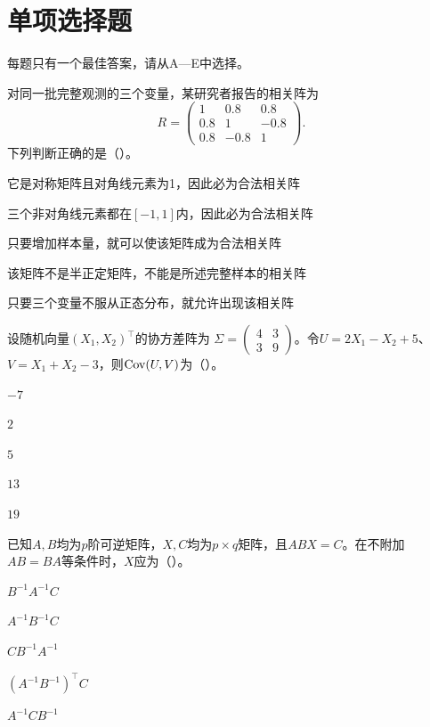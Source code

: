 \setcounter{chapter}{1}
\section{单项选择题}
每题只有一个最佳答案，请从A—E中选择。

\par\noindent\begin{minipage}{\linewidth}
对同一批完整观测的三个变量，某研究者报告的相关阵为
\[
R=\begin{pmatrix}1&0.8&0.8\\0.8&1&-0.8\\0.8&-0.8&1\end{pmatrix}.
\]
下列判断正确的是（\quad）。
\begin{choices}
\item 它是对称矩阵且对角线元素为1，因此必为合法相关阵
\item 三个非对角线元素都在$[-1,1]$内，因此必为合法相关阵
\item 只要增加样本量，就可以使该矩阵成为合法相关阵
\item 该矩阵不是半正定矩阵，不能是所述完整样本的相关阵
\item 只要三个变量不服从正态分布，就允许出现该相关阵
\end{choices}
\end{minipage}\par\medskip

\par\noindent\begin{minipage}{\linewidth}
设随机向量$(X_1,X_2)^\top$的协方差阵为
$\Sigma=\begin{pmatrix}4&3\\3&9\end{pmatrix}$。令$U=2X_1-X_2+5$、$V=X_1+X_2-3$，则$\operatorname{Cov}(U,V)$为（\quad）。
\begin{choices}
\item $-7$
\item $2$
\item $5$
\item $13$
\item $19$
\end{choices}
\end{minipage}\par\medskip

\par\noindent\begin{minipage}{\linewidth}
已知$A,B$均为$p$阶可逆矩阵，$X,C$均为$p\times q$矩阵，且$ABX=C$。在不附加$AB=BA$等条件时，$X$应为（\quad）。
\begin{choices}
\item $B^{-1}A^{-1}C$
\item $A^{-1}B^{-1}C$
\item $C B^{-1}A^{-1}$
\item $(A^{-1}B^{-1})^\top C$
\item $A^{-1}CB^{-1}$
\end{choices}
\end{minipage}\par\medskip

